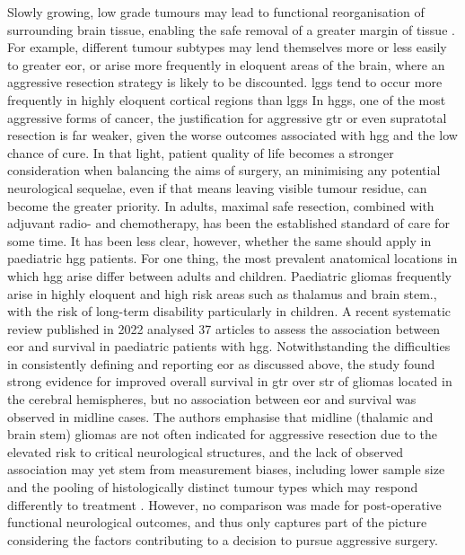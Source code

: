 Slowly growing, low grade tumours may lead to functional reorganisation of surrounding brain tissue, enabling the safe removal of a greater margin of tissue . \autocite{Rossi2019a}
For example, different tumour subtypes may lend themselves more or less easily to greater \gls{eor}, or arise more frequently in eloquent areas of the brain, where an aggressive resection strategy is likely to be discounted.\autocite{deLeeuw2019}
\Glspl{lgg} tend to occur more frequently in highly eloquent cortical regions than \glspl{lgg} \autocite{Duffau2004}
In \glspl{hgg}, one of the most aggressive forms of cancer, the justification for aggressive \gls{gtr} or even supratotal resection is far weaker, given the worse outcomes associated with \gls{hgg} and the low chance of cure.
In that light, patient quality of life becomes a stronger consideration when balancing the aims of surgery, an minimising any potential neurological sequelae, even if that means leaving visible tumour residue, can become the greater priority.
In adults, maximal safe resection, combined with adjuvant radio- and chemotherapy, has been the established standard of care for some time.
It has been less clear, however, whether the same should apply in paediatric \gls{hgg} patients.
For one thing, the most prevalent anatomical locations in which \gls{hgg} arise differ between adults and children.
Paediatric gliomas frequently arise in highly eloquent and high risk  areas such as thalamus and brain stem., with the risk of long-term disability particularly  in children.
A recent systematic review published in 2022 analysed 37 articles to assess the association between \gls{eor} and survival in paediatric patients with \gls{hgg}.\autocite{Hatoum2022}
Notwithstanding the difficulties in consistently defining and reporting \gls{eor} as discussed above, the study found strong evidence for  improved overall survival in \gls{gtr} over \gls{str} of gliomas located in the cerebral hemispheres, but no association between \gls{eor} and survival was observed in midline cases.
The authors emphasise that midline (thalamic and brain stem) gliomas are not often indicated for aggressive resection due to the elevated risk to critical neurological structures, and the lack of observed association may yet stem from measurement biases, including lower sample size and the pooling of histologically distinct tumour types which may respond differently to treatment .
However, no comparison was made for post-operative functional neurological outcomes, and thus only captures part of the picture considering the factors contributing to a decision to pursue aggressive surgery.

